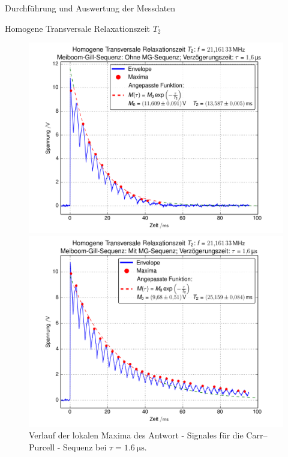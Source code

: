 \documentclass[pdftex, a4paper,11pt, twoside, ngerman]{report}
\begin{document}
\begin{chapter}{Durchführung und Auswertung der Messdaten}
\begin{section}{
        Homogene Transversale Relaxationszeit $T_{2}$}
\begin{subsection}
        \begin{figure}[htb]
          \centering
          \begin{minipage}{.48\textwidth}
            \centering
            \includegraphics[width=\textwidth]
            {Figures/HomoTransRelax_MG_env0.png}
            \caption{Verlauf der lokalen Maxima des Antwort - Signales für die
              Carr--Purcell - Sequenz bei $\tau = \SI{1.6}{\micro\second}$.}
            \label{figMG_env0}
          \end{minipage}\quad
          \begin{minipage}{.48\textwidth}
            \centering
            \includegraphics[width=\textwidth]
            {Figures/HomoTransRelax_MG_env1.png}

\end{minipage}
\end{figure}
\end{subsection}
\end{section}
\end{chapter}
\end{document}

